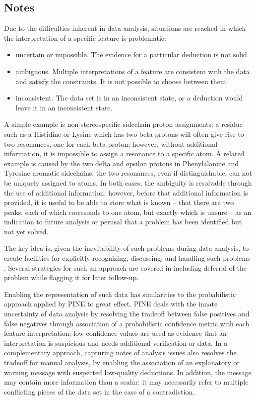 \subsection{Notes}
Due to the difficulties inherent in data analysis, situations are reached
in which the interpretation of a specific feature is problematic:
\begin{itemize}
  \item uncertain or impossible.  The evidence for a particular deduction 
    is not solid.
  \item ambiguous.  Multiple interpretations of a feature are consistent
    with the data and satisfy the constraints.  It is not possible to choose
    between them.
  \item inconsistent.  The data set is in an inconsistent state, or a 
    deduction would leave it in an inconsistent state.
\end{itemize}
A simple example is non-stereospecific sidechain proton assignments: 
a residue such as a Histidine or Lysine which has two beta protons will 
often give rise to two resonances, one for each beta proton; however, 
without additional information, it is impossible to assign a resonance to
a specific atom.  A related example is caused by the two delta and epsilon
protons in Phenylalanine and Tyrosine aromatic sidechains; the two resonances,
even if distinguishable, can not be uniquely assigned to atoms.  In both
cases, the ambiguity is resolvable through the use of additional information;
however, before that additional information is provided, it is useful to be
able to store what is known -- that there are two peaks, each of which 
corresonds to one atom, but exactly which is unsure -- as an indication to
future analysis or perusal that a problem has been identified but not yet
solved.

The key idea is, given the inevitability of such problems during data
analysis, to create facilities for explicitly recognizing, discussing, 
and handling such problems \cite{robillard2007concerns}. 
Several strategies for such an approach 
are covered in \cite{nuseibeh2000inconsistency} including deferral of the
problem while flagging it for later follow-up.

Enabling the representation of such data has similarities to the probabilistic
approach applied by PINE \cite{pine} to great effect.  
PINE deals with the innate uncertainty of data 
analysis by resolving the tradeoff between false positives and false 
negatives through association of a probabilistic confidence metric with each
feature interpretation; low confidence values are used as evidence that an
interpretation is suspicious and needs additional verification or data.
In a complementary approach, capturing notes of analysis issues also 
resolves the tradeoff for manual analysis, by enabling the association of
an explanatory or warning message with suspected low-quality deductions.
In addition, the message may contain more information than a scalar: it may
necessarily refer to multiple conflicting pieces of the data set in the case
of a contradiction.

